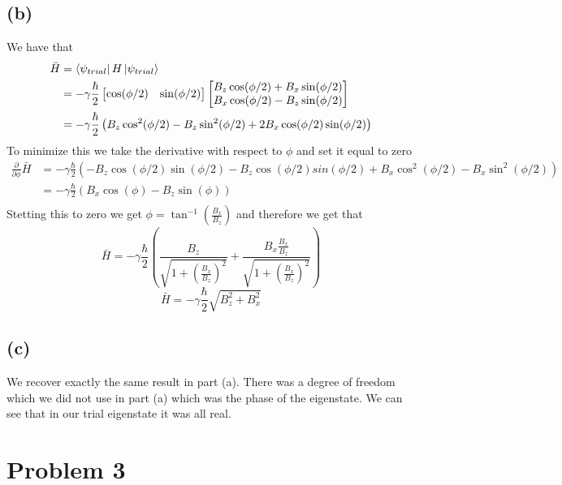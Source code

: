 \documentclass[11pt]{article}
\begin{document}
\subsection*{(b)}
We have that 
\begin{align*}
    \bar{H}&=\bra{\psi_{trial}}H\ket{\psi_{trial}}\\
    &=-\gamma\frac{\hbar}{2}\begin{bmatrix}
        \cos(\phi /2) & \sin(\phi /2)
    \end{bmatrix}
    \begin{bmatrix}
        B_z\cos(\phi /2)+B_x\sin(\phi /2)\\
        B_x\cos(\phi /2)-B_z\sin(\phi /2)
    \end{bmatrix}\\
    &=-\gamma\frac{\hbar}{2}\left(B_z\cos^2(\phi /2)-B_z\sin^2(\phi /2)+2B_x\cos(\phi /2)\sin(\phi /2)\right)\\
\end{align*}
To minimize this we take the derivative with respect to $\phi$ and set it equal to zero
\begin{align*}
    \frac{\partial}{\partial \phi} \bar{H} &= -\gamma\frac{\hbar}{2}\left(-B_z\cos(\phi/2)\sin(\phi/2)-B_z\cos(\phi/2)sin(\phi/2)+B_x\cos^2(\phi/2)-B_x\sin^2(\phi/2)\right)\\
    &=-\gamma\frac{\hbar}{2}\left(B_x\cos(\phi)-B_z\sin(\phi)\right)\\
\end{align*}
Stetting this to zero we get $\phi=\tan^{-1}\left(\frac{B_x}{B_z}\right)$ and therefore 
we get that 
$$\bar{H} = -\gamma\frac{\hbar}{2}\left(\frac{B_z}{\sqrt{1+\left(\frac{B_x}{B_z}\right)^2}}+\frac{B_x\frac{B_x}{B_z}}{\sqrt{1+\left(\frac{B_x}{B_z}\right)^2}}\right)$$
$$\bar{H} = -\gamma\frac{\hbar}{2}\sqrt{B_z^2+B_x^2}$$
\subsection*{(c)}
We recover exactly the same result in part (a). There was a degree of 
freedom which we did not use in part (a) which was the phase of the
eigenstate. We can see that in our trial eigenstate it was all real. 
\section*{Problem 3}
\end{document}
